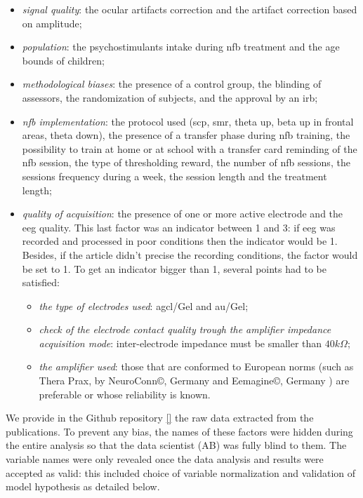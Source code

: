 \begin{itemize}
\item \emph{signal quality}: the ocular artifacts correction and the artifact correction based on amplitude; 
\item \emph{population}: the psychostimulants intake during \gls{nfb} treatment and the age bounds of children;
\item \emph{methodological biases}: the presence of a control group, the blinding of assessors, 
the randomization of subjects, and the approval by an \gls{irb};
\item \emph{\gls{nfb} implementation}: the protocol used (\gls{scp}, \gls{smr}, 
theta up, beta up in frontal areas, theta down), the presence of a transfer phase during \gls{nfb} training, the possibility to train at home 
or at school with a transfer card reminding of the \gls{nfb} session, 
the type of thresholding reward, the number of \gls{nfb} sessions, the sessions frequency during a week, the session length and the treatment length;
\item \emph{quality of acquisition}: the presence of one or more active electrode and the \gls{eeg} quality. 
This last factor was an indicator between 1 and 3: if \gls{eeg} was recorded and processed in poor conditions then the indicator would be 1. 
Besides, if the article didn't precise the recording conditions, the factor would be set to 1. To get an indicator bigger than 1, several 
points had to be satisfied:
\begin{itemize}
  \item \emph{the type of electrodes used}: \gls{agcl}/Gel and \gls{au}/Gel;
  \item \emph{check of the electrode contact quality trough the amplifier impedance acquisition mode}: inter-electrode impedance must be smaller than $40k\Omega$;  
  \item \emph{the amplifier used}: those that are conformed to European norms (such as Thera Prax\textregistered, by NeuroConn\copyright,
	Germany \citep{NeuroCare} and Eemagine\copyright, Germany \citep{Eemagine}) are preferable or whose reliability is known.
\end{itemize}
\end{itemize}

We provide in the Github repository \ref{} the raw data extracted from the publications. To prevent any bias, the names of these factors
were hidden during the entire analysis so that the data scientist (AB) was fully blind to them. The variable names were only revealed once the data 
analysis and results were accepted as valid: this included choice of variable normalization and validation of model hypothesis as detailed below.

